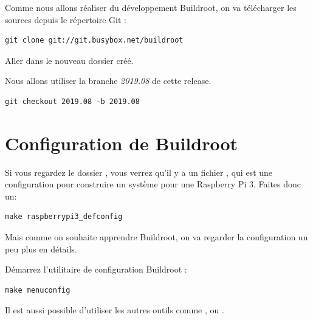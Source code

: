 Comme nous allons réaliser du développement Buildroot, on va télécharger les sources depuis le répertoire Git :

\begin{verbatim}
git clone git://git.busybox.net/buildroot
\end{verbatim}

Aller dans le nouveau dossier  créé.

Nous allons utiliser la branche {\em 2019.08} de cette release.

\begin{verbatim}
git checkout 2019.08 -b 2019.08
\end{verbatim}

\section{Configuration de Buildroot}

Si vous regardez le dossier , vous verrez qu'il y a un fichier
, qui est une configuration pour construire
un système pour une Raspberry Pi 3. Faites donc un:

\begin{verbatim}
make raspberrypi3_defconfig
\end{verbatim}

Mais comme on souhaite apprendre Buildroot, on va regarder la configuration
un peu plus en détails.

Démarrez l'utilitaire de configuration Buildroot :

\begin{verbatim}
make menuconfig
\end{verbatim}

Il est aussi possible d'utiliser les autres outils comme ,
 ou .

